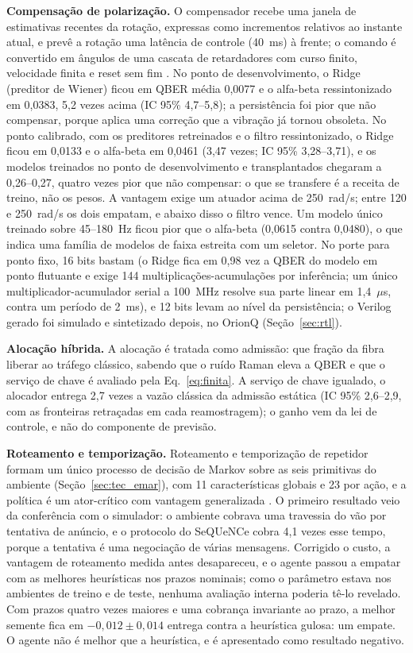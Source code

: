 \documentclass[12pt]{article}
\begin{document}
\label{sec:compensador}
\textbf{Compensação de polarização.} O compensador recebe uma janela de
estimativas recentes da rotação, expressas como incrementos relativos ao instante
atual, e prevê a rotação uma latência de controle (40~ms) à frente; o comando é
convertido em ângulos de uma cascata de retardadores com curso finito,
velocidade finita e reset sem fim \cite{noe1988}. No ponto de desenvolvimento, o
Ridge (preditor de Wiener) ficou em QBER média 0,0077 e o alfa-beta
ressintonizado em 0,0383, 5,2 vezes acima (IC 95\% 4,7--5,8); a persistência foi pior que não
compensar, porque aplica uma correção que a vibração já tornou obsoleta. No ponto
calibrado, com os preditores retreinados e o filtro ressintonizado, o Ridge ficou
em 0,0133 e o alfa-beta em 0,0461 (3,47 vezes; IC 95\% 3,28--3,71), e os modelos
treinados no ponto de desenvolvimento e transplantados chegaram a 0,26--0,27,
quatro vezes pior que não compensar: o que se transfere é a receita de treino,
não os pesos. A vantagem exige um atuador acima de 250~rad/s; entre 120 e
250~rad/s os dois empatam, e abaixo disso o filtro vence. Um modelo único treinado
sobre 45--180~Hz ficou pior que o alfa-beta (0,0615 contra 0,0480), o que indica
uma família de modelos de faixa estreita com um seletor. No porte para ponto
fixo, 16 bits bastam (o Ridge fica em 0,98 vez a QBER do modelo em ponto
flutuante e exige 144 multiplicações-acumulações por inferência; um único
multiplicador-acumulador serial a 100~MHz resolve sua parte linear em
1,4~$\mu$s, contra um período de 2~ms), e 12 bits levam ao nível da
persistência; o Verilog gerado foi simulado e sintetizado depois, no OrionQ
(Seção~\ref{sec:rtl}).

\label{sec:alocador}
\textbf{Alocação híbrida.} A alocação é tratada como admissão: que fração da
fibra liberar ao tráfego clássico, sabendo que o ruído Raman eleva a QBER e que o
serviço de chave é avaliado pela Eq.~\ref{eq:finita}. A serviço de chave
igualado, o alocador entrega 2,7 vezes a vazão clássica da admissão estática
(IC 95\% 2,6--2,9, com as fronteiras retraçadas em cada reamostragem); o ganho
vem da lei de controle, e não do componente de previsão.

\label{sec:roteamento}
\textbf{Roteamento e temporização.} Roteamento e temporização de repetidor formam
um único processo de decisão de Markov sobre as seis primitivas do ambiente
(Seção~\ref{sec:tec_emar}), com 11 características globais e 23 por ação, e a
política é um ator-crítico com vantagem generalizada \cite{schulman2016,mnih2016}.
O primeiro resultado veio da conferência com o simulador: o ambiente cobrava uma
travessia do vão por tentativa de anúncio, e o protocolo do SeQUeNCe cobra 4,1
vezes esse tempo, porque a tentativa é uma negociação de várias mensagens.
Corrigido o custo, a vantagem de roteamento medida antes desapareceu, e o agente
passou a empatar com as melhores heurísticas nos prazos nominais; como o
parâmetro estava nos ambientes de treino e de teste, nenhuma avaliação interna
poderia tê-lo revelado. Com prazos quatro vezes maiores e uma cobrança invariante
ao prazo, a melhor semente fica em $-0{,}012\pm0{,}014$ entrega contra a
heurística gulosa: um empate. O agente não é melhor que a heurística, e é
apresentado como resultado negativo.
\end{document}
